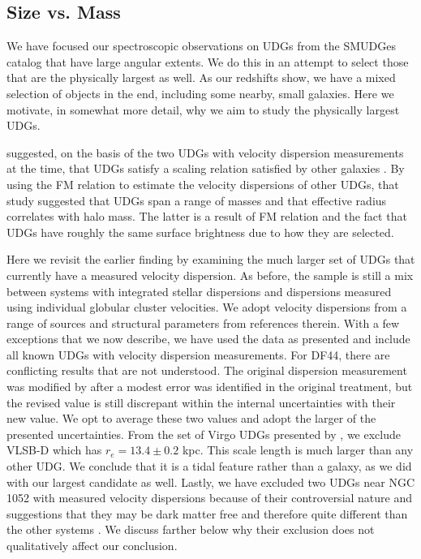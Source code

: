 \documentclass[twocolumn,tighten]{aastex63}
\begin{document}
\newpage
\begin{appendix}
\renewcommand\thefigure{\thesection.\arabic{figure}}  
\setcounter{figure}{0}

\section{Size vs. Mass}
\label{appendix}

We have focused our spectroscopic observations on UDGs from the SMUDGes catalog that have large angular extents. We do this in an attempt to select those that are the physically largest as well. As our redshifts show, we have a mixed selection of objects in the end, including some nearby, small galaxies. Here we motivate, in somewhat more detail, why we aim to study the physically largest UDGs. 

\cite{Zaritsky2017} suggested, on the basis of the two UDGs with velocity dispersion measurements at the time, that UDGs satisfy a scaling relation satisfied by other galaxies \citep[referred, in reference to its antecedent, to as Fundamental Manifold or FM]{Zaritsky06,Zaritsky08}. By using the FM relation to estimate the velocity dispersions of other UDGs, that study suggested that UDGs span a range of masses and that effective radius correlates with halo mass. The latter is a result of FM relation and the fact that UDGs have roughly the same surface brightness due to how they are selected.

Here we revisit the earlier finding by examining the much larger set of UDGs that currently have a measured velocity dispersion. As before, the sample is still a mix between systems with integrated stellar dispersions and dispersions measured using individual globular cluster velocities. 
We adopt velocity dispersions from a range of sources \citep{Beasley2016b,vanDokkum2017,toloba,Chilingarian2019,mn,vanDokkum2019b} and structural parameters from references therein. With a few exceptions that we now describe, we have used the data as presented and include all known UDGs with velocity dispersion measurements. For DF44, there are conflicting results \citep{vanDokkum2017,vanDokkum2019b} that are not understood. The original \cite{vanDokkum2017} dispersion measurement was modified by \cite{vanDokkum2019b} after a modest error was identified in the original treatment, but the revised value is still discrepant within the internal uncertainties with their new value. We opt to average these two values and adopt the larger of the presented uncertainties.
From the set of Virgo UDGs presented by \cite{toloba}, we exclude VLSB-D which has $r_e = 13.4\pm0.2$ kpc. This scale length is much larger than any other UDG. We conclude that it is a tidal feature rather than a galaxy, as we did with our largest candidate as well.
Lastly, we have excluded two UDGs near NGC 1052 with measured velocity dispersions \citep[NGC1052-DF2, NGC1052-DF4;][]{Danieli2019,vanDokkum2019a} because of their controversial nature and suggestions that they may be dark matter free and therefore quite different than the other systems \citep{vanDokkum2018,trujillo2019,danieli20}. We discuss farther below why their exclusion does not qualitatively affect our conclusion.


\end{appendix}
\end{document}
